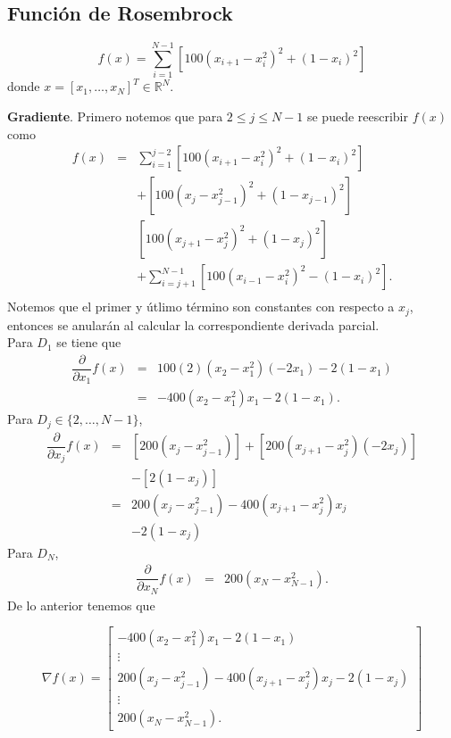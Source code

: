 \documentclass[11pt,letterpaper]{article}
\theoremstyle{definition}
\theoremstyle{definition}
\theoremstyle{definition}
\begin{document}
\subsection{Función de Rosembrock}
\begin{shaded*}
\[ f(x) = \sum_{i = 1}^{N-1} [100(x_{i+1} - x_i^2)^2 + (1 - x_i)^2] \]
donde $ x = [ x_1, \dots, x_N ]^T \in\mathbb{R}^N $.
\end{shaded*}
\textbf{Gradiente}.  Primero notemos que  para $ 2 \leq j \leq N-1 $ se puede reescribir $ f(x) $ como
\begin{eqnarray*}
	f(x) & = & \sum_{i = 1}^{j-2}  [100(x_{i+1}- x_i^2)^2 + (1-x_i)^2] \\
	     &   &  + [100(x_{j} - x_{j-1}^2)^2 + (1-x_{j-1})^2] \\
	&   & [100(x_{j+1} - x_{j}^2)^2 + (1-x_{j})^2] \\
	&   & +  \sum_{i = j+1}^{N-1} [100(x_{i-1} - x_i^2)^2 - (1-x_i)^2 ]. \\
\end{eqnarray*}
Notemos que el primer y útlimo término son constantes con respecto a $ x_j $, entonces se anularán al calcular la correspondiente derivada parcial.
\\
Para $ D_1 $ se tiene que
\begin{eqnarray*}
	\dfrac{\partial }{\partial x_1} f(x) & = & 100(2)(x_2 - x_1^2) (-2x_1) - 2(1-x_1)  \\
	& = &  -400(x_2 - x_1^2)x_1 - 2(1-x_1).
\end{eqnarray*}
Para $ D_j \in\{ 2, \dots, N-1 \} $,
\begin{eqnarray*}
	\dfrac{\partial }{\partial x_j} f(x) & = & [200(x_j - x_{j-1}^2)] + [ 200(x_{j+1} - x_j^2)(-2x_j)] \\
	& & - [2(1-x_j) ] \\
	& = & 200(x_j - x_{j-1}^2) - 400 (x_{j+1} - x_j^2) x_j  \\
	& & - 2(1-x_j)
\end{eqnarray*}
Para $ D_N $, 
\begin{eqnarray*}
	\dfrac{\partial }{\partial x_N} f(x) & = & 200(x_N - x_{N-1}^2).
\end{eqnarray*}
De lo anterior tenemos que
\begin{shaded*}
\footnotesize{
\begin{equation*}
	\nabla f(x)  =  \left[\begin{matrix}
		-400(x_2 - x_1^2) x_1 - 2(1-x_1) \\
		\vdots							 \\
		200(x_j - x_{j-1}^2) - 400(x_{j+1} - x_j^2)x_j - 2(1-x_j)					 \\
		\vdots  						 \\
		200(x_N - x_{N-1}^2).
	\end{matrix}\right]
\end{equation*}}
\end{shaded*}
\end{document}
